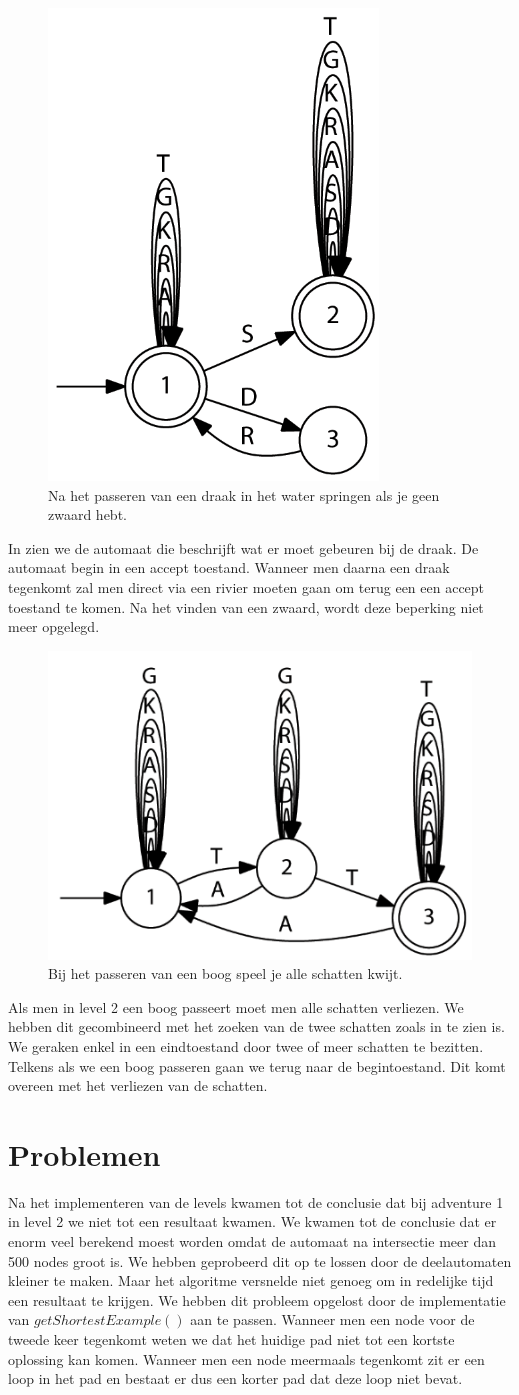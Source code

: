 \documentclass[a4paper, 11pt]{article}
\begin{document}
		\begin{figure}[H]
			\centering
			\includegraphics[width=0.3\linewidth]{draak}
			\caption{Na het passeren van een draak in het water springen als je geen zwaard hebt.}
			\label{fig:draak}
		\end{figure}
	
		In  zien we de automaat die beschrijft wat er moet gebeuren bij de draak. De automaat begin in een accept toestand. Wanneer men daarna een draak tegenkomt zal men direct via een rivier moeten gaan om terug een een accept toestand te komen. Na het vinden van een zwaard, wordt deze beperking niet meer opgelegd.
			
		
		\begin{figure}[H]
			\centering
			\includegraphics[width=0.4\linewidth]{boog}
			\caption{Bij het passeren van een boog speel je alle schatten kwijt.}
			\label{fig:boog}
		\end{figure}
		
		Als men in level 2 een boog passeert moet men alle schatten verliezen. We hebben dit gecombineerd met het zoeken van de twee schatten zoals in  te zien is. We geraken enkel in een eindtoestand door twee of meer schatten te bezitten. Telkens als we een boog passeren gaan we terug naar de begintoestand. Dit komt overeen met het verliezen van de schatten.
	
	\section{Problemen}
		Na het implementeren van de levels kwamen tot de conclusie dat bij adventure 1 in level 2 we niet tot een resultaat kwamen. We kwamen tot de conclusie dat er enorm veel berekend moest worden omdat de automaat na intersectie meer dan 500 nodes groot is. We hebben geprobeerd dit op te lossen door de deelautomaten kleiner te maken. Maar het algoritme versnelde niet genoeg om in redelijke tijd een resultaat te krijgen. We hebben dit probleem opgelost door de implementatie van $getShortestExample()$ aan te passen. Wanneer men een node voor de tweede keer tegenkomt weten we dat het huidige pad niet tot een kortste oplossing kan komen. Wanneer men een node meermaals tegenkomt zit er een loop in het pad en bestaat er dus een korter pad dat deze loop niet bevat.
		
\end{document}
